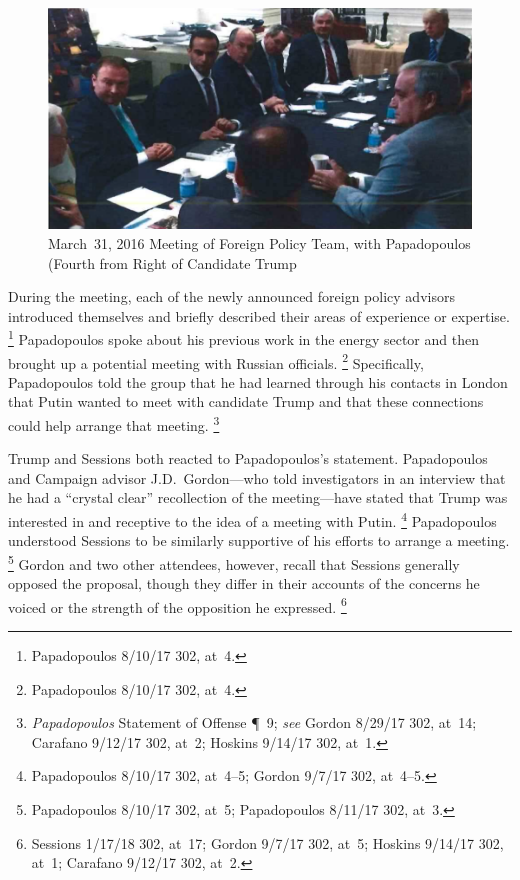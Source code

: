 \begin{figure}[t]
    \vspace{-20pt}
    \begin{center}
        \includegraphics[width=5in]{images/p-86-foreign-policy-team.png}%
    \end{center}
    \vspace{-20pt}
    \caption*{March~31, 2016 Meeting of Foreign Policy Team, with Papadopoulos (Fourth from Right of Candidate Trump}
    \vspace{-10pt}
    \label{fig:foreign-policy-team}
\end{figure}

During the meeting, each of the newly announced foreign policy advisors introduced themselves and briefly described their areas of experience or expertise.%
\footnote{Papadopoulos 8/10/17 302, at~4.}
Papadopoulos spoke about his previous work in the energy sector and then brought up a potential meeting with Russian officials.%
\footnote{Papadopoulos 8/10/17 302, at~4.}
Specifically, Papadopoulos told the group that he had learned through his contacts in London that Putin wanted to meet with candidate Trump and that these connections could help arrange that meeting.%
\footnote{\textit{Papadopoulos} Statement of Offense \P~9; \textit{see} Gordon 8/29/17 302, at~14; Carafano 9/12/17 302, at~2; Hoskins 9/14/17 302, at~1.}

Trump and Sessions both reacted to Papadopoulos's statement. Papadopoulos and Campaign advisor J.D.~Gordon---who told investigators in an interview that he had a ``crystal clear'' recollection of the meeting---have stated that Trump was interested in and receptive to the idea of a meeting with Putin.%
\footnote{Papadopoulos 8/10/17 302, at~4--5; Gordon 9/7/17 302, at~4--5.}
Papadopoulos understood Sessions to be similarly supportive of his efforts to arrange a meeting.%
\footnote{Papadopoulos 8/10/17 302, at~5; Papadopoulos 8/11/17 302, at~3.}
Gordon and two other attendees, however, recall that Sessions generally opposed the proposal, though they differ in their accounts of the concerns he voiced or the strength of the opposition he expressed.%
\footnote{Sessions 1/17/18 302, at~17; Gordon 9/7/17 302, at~5; Hoskins 9/14/17 302, at~1; Carafano 9/12/17 302, at~2.}

